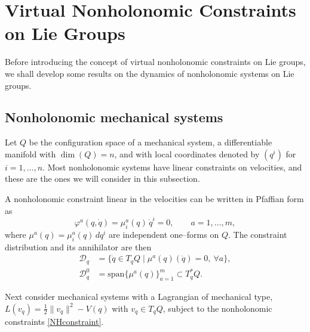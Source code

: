 \documentclass[letterpaper, 10 pt, conference]{ieeeconf}
\begin{document}
\section{Virtual Nonholonomic Constraints on Lie Groups}\label{sec5}
Before introducing the concept of virtual nonholonomic constraints on Lie groups, we shall develop some results on the dynamics of nonholonomic systems on Lie groups. 


\subsection{Nonholonomic mechanical systems}
Let $Q$ be the configuration space of a mechanical system, a differentiable manifold with $\dim(Q)=n$, and with local coordinates denoted by $(q^i)$ for $i=1,\ldots,n$. Most nonholonomic systems have linear constraints on velocities, and these are the ones we will consider in this subsection.

A nonholonomic constraint linear in the velocities can be written in Pfaffian form as
\begin{equation}\label{NHconstraint}
\varphi^a(q,\dot q) = \mu^a_i(q)\,\dot q^i = 0, \qquad a=1,\dots,m,\end{equation}where $\mu^a(q) = \mu^a_i(q)\,dq^i$ are independent one–forms on $Q$. 
The constraint distribution and its annihilator are then
\begin{align*}\mathcal{D}_q &= \{\dot q \in T_q Q \mid \mu^a(q)(\dot q)=0,\ \forall a\},\\ 
\mathcal{D}_q^0 &= \mathrm{span}\{\mu^a(q)\}_{a=1}^m \subset T^*_qQ.\end{align*}


Next consider mechanical systems with a Lagrangian of mechanical type, $L(v_q)= \tfrac12 \|v_q\|^2 - V(q)$ with $v_q\in T_qQ$, subject to the nonholonomic constraints \eqref{NHconstraint}.  
\end{document}
